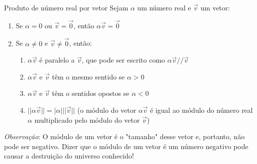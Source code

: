 \begin{frame}{Produto de número real por vetor}
    Sejam \(\alpha\) um número real e \(\vec{v}\) um vetor:

    \begin{enumerate}
        \item Se \(\alpha =0 \) ou \(\vec{v}=\vec{0}\), então \(\alpha \vec{v}=\vec{0}\)
        \item Se \(\alpha \neq 0 \) e \(\vec{v} \neq \vec{0}\), então:
            \begin{enumerate}
                \item \(\alpha\vec{v}\) é paralelo a \(\vec{v}\), que pode ser escrito como
                    \(\alpha\vec{v} // \vec{v}\)
                \item \(\alpha\vec{v}\) e \(\vec{v}\) têm o mesmo sentido se \(\alpha > 0\)
                \item  \(\alpha\vec{v}\) e \(\vec{v}\) têm o sentidos opostos se \(\alpha < 0\)
                \item \(||\alpha\vec{v}||=|\alpha| ||\vec{v}||\) (o módulo do vetor \(\alpha\vec{v}\) é igual ao módulo do número real \(\alpha\) multiplicado pelo módulo do vetor \(\vec{v}\))
            \end{enumerate}
    \end{enumerate}

    \vspace{1cm}

    \textit{Observação}: O módulo de um vetor é o "tamanho" desse vetor e, portanto, não pode ser negativo. Dizer que o módulo de um
    vetor é um número negativo pode causar a destruição do universo conhecido!
\end{frame}

